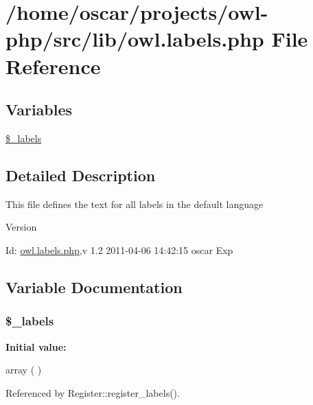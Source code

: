 \section{/home/oscar/projects/owl-\/php/src/lib/owl.labels.php File Reference}
\label{owl_8labels_8php}
\subsection*{Variables}
\begin{DoxyCompactItemize}
\item 
\hyperlink{owl_8labels_8php_a2ec9873ed5b12f5516e61365717fa6c0}{\$\_\-labels}
\end{DoxyCompactItemize}


\subsection{Detailed Description}
This file defines the text for all labels in the default language \begin{DoxyVersion}{Version}

\end{DoxyVersion}
\begin{DoxyParagraph}{Id:}
\hyperlink{owl_8labels_8php}{owl.labels.php},v 1.2 2011-\/04-\/06 14:42:15 oscar Exp 
\end{DoxyParagraph}


\subsection{Variable Documentation}
\subsubsection[{\$\_\-labels}]{\setlength{\rightskip}{0pt plus 5cm}\$\_\-labels}\label{owl_8labels_8php_a2ec9873ed5b12f5516e61365717fa6c0}
{\bfseries Initial value:}
\begin{DoxyCode}
 array (
)
\end{DoxyCode}


Referenced by Register::register\_\-labels().

